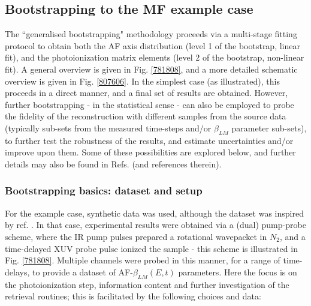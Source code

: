 \documentclass[10pt]{article}
\begin{document}
\subsection{Bootstrapping to the MF example case\label{sec:bootstrapping}}


The ``generalised bootstrapping" methodology proceeds via a multi-stage fitting protocol to obtain both the AF axis distribution (level 1 of the bootstrap, linear fit), and the photoionization matrix elements (level 2 of the bootstrap, non-linear fit). A general overview is given in Fig. \ref{781808}, and a more detailed schematic overview is given in Fig. \ref{807606}. In the simplest case (as illustrated), this proceeds in a direct manner, and a final set of results are obtained. However, further bootstrapping - in the statistical sense - can also be employed to probe the fidelity of the reconstruction with different samples from the source data (typically sub-sets from the measured time-steps and/or $\beta_{LM}$ parameter sub-sets), to further test the robustness of the results, and estimate uncertainties and/or improve upon them. Some of these possibilities are explored below, and further details may also be found in Refs. \cite{hockett2018QMP1,hockett2018QMP2,marceau2017MolecularFrameReconstruction} (and references therein).





\subsubsection{Bootstrapping basics: dataset and setup}

For the example case, synthetic data was used, although the dataset was inspired by ref. \cite{marceau2017MolecularFrameReconstruction}. In that case, experimental results were obtained via a (dual) pump-probe scheme, where the IR pump pulses prepared a rotational wavepacket in $N_2$, and a time-delayed XUV probe pulse ionized the sample - this scheme is illustrated in Fig. \ref{781808}. Multiple channels were probed in this manner, for a range of time-delays, to provide a dataset of AF-$\beta_{LM}(E,t)$ parameters. Here the focus is on the photoionization step, information content and further investigation of the retrieval routines; this is facilitated by the following choices and data:
\end{document}
